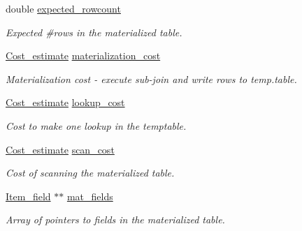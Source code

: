 \begin{DoxyCompactItemize}
double \mbox{\hyperlink{structSemijoin__mat__optimize_a933e3977fcf5bf765573cff3740743c8}{expected\+\_\+rowcount}}
\begin{DoxyCompactList}\small\item\em Expected \#rows in the materialized table. \end{DoxyCompactList}\item 
\mbox{\label{structSemijoin__mat__optimize_aa9c3f89722ff096a12dd4e203e514c78}} 
\mbox{\hyperlink{classCost__estimate}{Cost\+\_\+estimate}} \mbox{\hyperlink{structSemijoin__mat__optimize_aa9c3f89722ff096a12dd4e203e514c78}{materialization\+\_\+cost}}
\begin{DoxyCompactList}\small\item\em Materialization cost -\/ execute sub-\/join and write rows to temp.\+table. \end{DoxyCompactList}\item 
\mbox{\label{structSemijoin__mat__optimize_ab0884cb4a9503fadf397370b031c21b2}} 
\mbox{\hyperlink{classCost__estimate}{Cost\+\_\+estimate}} \mbox{\hyperlink{structSemijoin__mat__optimize_ab0884cb4a9503fadf397370b031c21b2}{lookup\+\_\+cost}}
\begin{DoxyCompactList}\small\item\em Cost to make one lookup in the temptable. \end{DoxyCompactList}\item 
\mbox{\label{structSemijoin__mat__optimize_ac12a0028b62abbb8fb77371a5a8d9cf7}} 
\mbox{\hyperlink{classCost__estimate}{Cost\+\_\+estimate}} \mbox{\hyperlink{structSemijoin__mat__optimize_ac12a0028b62abbb8fb77371a5a8d9cf7}{scan\+\_\+cost}}
\begin{DoxyCompactList}\small\item\em Cost of scanning the materialized table. \end{DoxyCompactList}\item 
\mbox{\label{structSemijoin__mat__optimize_af0527a7114db374cb66b121b081e3df3}} 
\mbox{\hyperlink{classItem__field}{Item\+\_\+field}} $\ast$$\ast$ \mbox{\hyperlink{structSemijoin__mat__optimize_af0527a7114db374cb66b121b081e3df3}{mat\+\_\+fields}}
\begin{DoxyCompactList}\small\item\em Array of pointers to fields in the materialized table. \end{DoxyCompactList}\end{DoxyCompactItemize}


